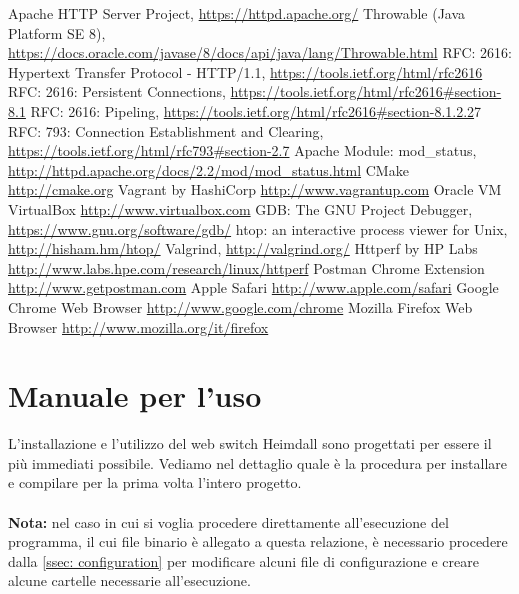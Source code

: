 \documentclass[italian]{tktltiki2}
\begin{document}
\newpage
%
%
\renewcommand{\refname}{\normalfont\selectfont\normalsize\textbf{Annotazioni}} 
\begin{thebibliography}{9}
  Apache HTTP Server Project, \url{https://httpd.apache.org/}
  Throwable (Java Platform SE 8), \url{https://docs.oracle.com/javase/8/docs/api/java/lang/Throwable.html}
  RFC: 2616: Hypertext Transfer Protocol - HTTP/1.1, \url{https://tools.ietf.org/html/rfc2616}
  RFC: 2616: Persistent Connections, \url{https://tools.ietf.org/html/rfc2616#section-8.1}
  RFC: 2616: Pipeling, \url{https://tools.ietf.org/html/rfc2616#section-8.1.2.2}7
  RFC: 793: Connection Establishment and Clearing, \url{https://tools.ietf.org/html/rfc793#section-2.7}
  Apache Module: mod\_status, \url{http://httpd.apache.org/docs/2.2/mod/mod_status.html}
  CMake \url{http://cmake.org}
  Vagrant by HashiCorp \url{http://www.vagrantup.com}
  Oracle VM VirtualBox \url{http://www.virtualbox.com}
  GDB: The GNU Project Debugger, \url{https://www.gnu.org/software/gdb/}
  htop: an interactive process viewer for Unix, \url{http://hisham.hm/htop/}
  Valgrind, \url{http://valgrind.org/}
  Httperf by HP Labs \url{http://www.labs.hpe.com/research/linux/httperf}
  Postman Chrome Extension \url{http://www.getpostman.com}
  Apple Safari \url{http://www.apple.com/safari}
  Google Chrome Web Browser \url{http://www.google.com/chrome}
  Mozilla Firefox Web Browser \url{http://www.mozilla.org/it/firefox}
\end{thebibliography}

\newpage
\appendix
\newpage
\section{Manuale per l'uso}
L'installazione e l'utilizzo del web switch Heimdall sono progettati per essere il più immediati possibile. Vediamo nel dettaglio quale è la procedura per installare e compilare per la prima volta l'intero progetto. 
\\
\\
\textbf{Nota:} nel caso in cui si voglia procedere direttamente all'esecuzione del programma, il cui file binario è allegato a questa relazione, è necessario procedere dalla \ref{ssec: configuration} per modificare alcuni file di configurazione e creare alcune cartelle necessarie all'esecuzione.
\end{document}
